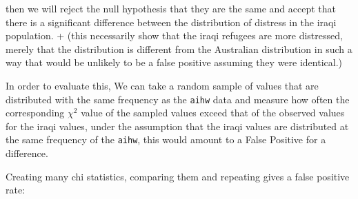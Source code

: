 \documentclass[
]{article}
\begin{document}
then we will reject the null hypothesis that they are the same and
accept that there is a significant difference between the distribution
of distress in the iraqi population. + (this necessarily show that the
iraqi refugees are more distressed, merely that the distribution is
different from the Australian distribution in such a way that would be
unlikely to be a false positive assuming they were identical.)

In order to evaluate this, We can take a random sample of values that
are distributed with the same frequency as the \texttt{aihw} data and
measure how often the corresponding \(\chi^2\) value of the sampled
values exceed that of the observed values for the iraqi values, under
the assumption that the iraqi values are distributed at the same
frequency of the \texttt{aihw}, this would amount to a False Positive
for a difference.

Creating many chi statistics, comparing them and repeating gives a false
positive rate:
\end{document}
